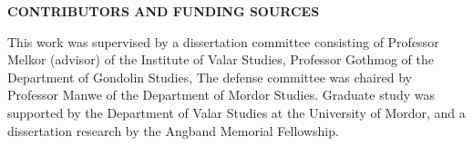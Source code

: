 \clearpage
\begin{centering}
\textbf{CONTRIBUTORS AND FUNDING SOURCES}\\
\vspace{\baselineskip}
\end{centering}

This work was supervised by a dissertation committee consisting of
Professor Melkor (advisor) of the Institute of Valar Studies,
Professor Gothmog of the Department of Gondolin Studies,
The defense committee was chaired by Professor Manwe of the Department of Mordor Studies.
Graduate study was supported by the Department of Valar Studies at the University of Mordor, and a dissertation research by the Angband Memorial Fellowship.
